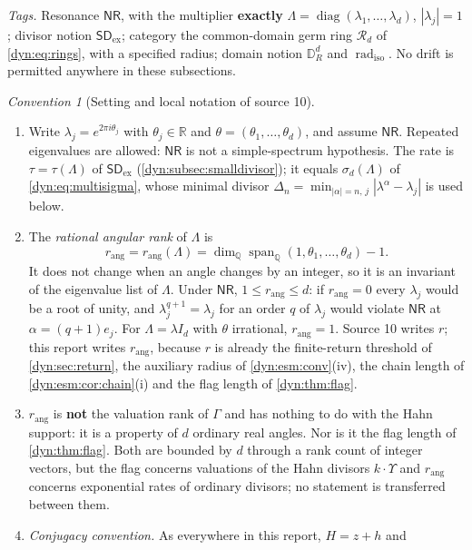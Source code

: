 \documentclass[11pt,letterpaper]{article}
\theoremstyle{definition}
\theoremstyle{remark}
\newtheorem{convention}[convention]{Convention}
\newcommand{\R}{\mathbb R}
\newcommand{\Q}{\mathbb Q}
\newcommand{\radiso}{\operatorname{rad}_{\mathrm{iso}}}
\newcommand{\sdex}{\mathsf{SD}_{\mathrm{ex}}}
\newcommand{\nres}{\mathsf{NR}}
\newcommand{\rang}{r_{\mathrm{ang}}}
\numberwithin{equation}{section}
\begin{document}
\emph{Tags.} Resonance $\nres$, with the multiplier \textbf{exactly}
$\Lambda=\operatorname{diag}(\lambda_1,\dots,\lambda_d)$, $|\lambda_j|=1$;
divisor notion $\sdex$; category the common-domain germ ring $\mathcal R_d$
of \eqref{dyn:eq:rings}, with a specified radius; domain notion
$\mathbb D_R^{d}$ and $\radiso$. No drift is permitted anywhere in these
subsections.

\begin{convention}[Setting and local notation of source 10]
\label{dyn:nsc:conv}
\begin{enumerate}[label=(\roman*)]
\item Write $\lambda_j=e^{2\pi i\theta_j}$ with $\theta_j\in\R$ and
$\theta=(\theta_1,\dots,\theta_d)$, and assume $\nres$. Repeated eigenvalues
are allowed: $\nres$ is not a simple-spectrum hypothesis. The rate is
$\tau=\tau(\Lambda)$ of $\sdex$ (\cref{dyn:subsec:smalldivisor}); it equals
$\sigma_d(\Lambda)$ of \eqref{dyn:eq:multisigma}, whose minimal divisor
$\Delta_n=\min_{|\alpha|=n,\,j}|\lambda^{\alpha}-\lambda_j|$ is used below.
\item The \emph{rational angular rank} of $\Lambda$ is
\begin{equation}\label{dyn:nsc:eq:rank}
 \rang=\rang(\Lambda)=\dim_{\Q}\operatorname{span}_{\Q}(1,\theta_1,\dots,\theta_d)-1 .
\end{equation}
It does not change when an angle changes by an integer, so it is an
invariant of the eigenvalue list of $\Lambda$. Under $\nres$,
$1\le\rang\le d$: if $\rang=0$ every $\lambda_j$ would be a root of unity,
and $\lambda_j^{q+1}=\lambda_j$ for an order $q$ of $\lambda_j$ would violate
$\nres$ at $\alpha=(q+1)e_j$. For $\Lambda=\lambda I_d$ with $\theta$
irrational, $\rang=1$. Source 10 writes $r$; this report writes $\rang$,
because $r$ is already the finite-return threshold of \cref{dyn:sec:return},
the auxiliary radius of \cref{dyn:esm:conv}(iv), the chain length of
\cref{dyn:esm:cor:chain}(i) and the flag length of \cref{dyn:thm:flag}.
\item $\rang$ is \textbf{not} the valuation rank of $\Gamma$ and has nothing
to do with the Hahn support: it is a property of $d$ ordinary real angles.
Nor is it the flag length of \cref{dyn:thm:flag}. Both are bounded by $d$
through a rank count of integer vectors, but the flag concerns valuations
of the Hahn divisors $k\cdot\Upsilon$ and $\rang$ concerns exponential
rates of ordinary divisors; no statement is transferred between them.
\item \emph{Conjugacy convention.} As everywhere in this report, $H=z+h$ and

\end{enumerate}
\end{convention}
\end{document}
